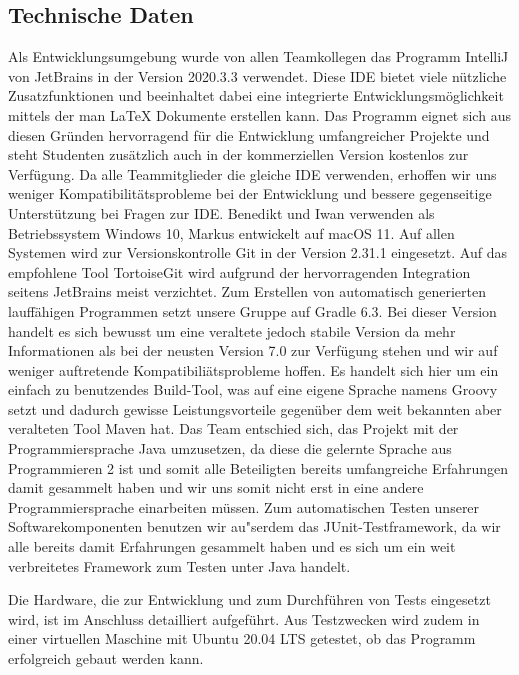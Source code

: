 \newpage

\subsection{Technische Daten}\label{subsec:technische-daten}
Als Entwicklungsumgebung wurde von allen Teamkollegen das Programm IntelliJ von JetBrains in der Version 2020.3.3 verwendet.
Diese IDE bietet viele n\"utzliche Zusatzfunktionen und beeinhaltet dabei eine integrierte Entwicklungsm\"oglichkeit mittels der man LaTeX Dokumente erstellen kann.
Das Programm eignet sich aus diesen Gr\"unden hervorragend f\"ur die Entwicklung umfangreicher Projekte und steht Studenten zus\"atzlich auch in der kommerziellen Version kostenlos zur Verf\"ugung.
Da alle Teammitglieder die gleiche IDE verwenden, erhoffen wir uns weniger Kompatibilit\"atsprobleme bei der Entwicklung und bessere gegenseitige Unterst\"utzung bei Fragen zur IDE.
Benedikt und Iwan verwenden als Betriebssystem Windows 10, Markus entwickelt auf macOS 11.
Auf allen Systemen wird zur Versionskontrolle Git in der Version 2.31.1 eingesetzt.
Auf das empfohlene Tool TortoiseGit wird aufgrund der hervorragenden Integration seitens JetBrains meist verzichtet.
Zum Erstellen von automatisch generierten lauff\"ahigen Programmen setzt unsere Gruppe auf Gradle 6.3.
Bei dieser Version handelt es sich bewusst um eine veraltete jedoch stabile Version da mehr Informationen als bei der neusten Version 7.0 zur Verf\"ugung stehen und wir auf weniger auftretende Kompatibili\"atsprobleme hoffen.
Es handelt sich hier um ein einfach zu benutzendes Build-Tool, was auf eine eigene Sprache namens Groovy setzt und dadurch gewisse Leistungsvorteile gegen\"uber dem weit bekannten aber veralteten Tool Maven hat.
Das Team entschied sich, das Projekt mit der Programmiersprache Java umzusetzen, da diese die gelernte Sprache aus Programmieren 2 ist und somit alle Beteiligten bereits umfangreiche Erfahrungen damit gesammelt haben und wir uns somit nicht erst in eine andere Programmiersprache einarbeiten m\"ussen.
Zum automatischen Testen unserer Softwarekomponenten benutzen wir au"serdem das JUnit-Testframework, da wir alle bereits damit Erfahrungen gesammelt haben und es sich um ein weit verbreitetes Framework zum Testen unter Java handelt.

Die Hardware, die zur Entwicklung und zum Durchf\"uhren von Tests eingesetzt wird, ist im Anschluss detailliert aufgef\"uhrt.
Aus Testzwecken wird zudem in einer virtuellen Maschine mit Ubuntu 20.04 LTS getestet, ob das Programm erfolgreich gebaut werden kann.

